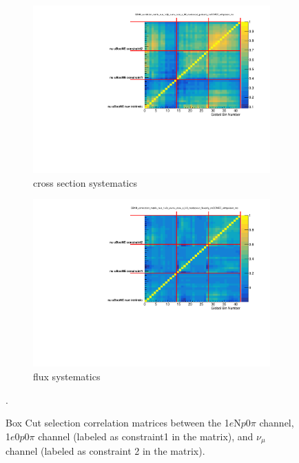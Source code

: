 \documentclass[a4paper]{article}
\newcommand{\npsel}{1$e$N$p$0$\pi$\xspace}
\newcommand{\zpsel}{1$e$0$p$0$\pi$\xspace}
\begin{document}
\begin{figure}[ht] 
\begin{center}
    \begin{subfigure}[b]{0.45\textwidth}
    \centering
    \includegraphics[width=1.00\textwidth]{Sensitivity/CorrelationMatrices/SBNfit_correlation_matrix_nue_1e0p_numu_reco_e_H0_newboxcut_genieonly_noCCMEC_withpoiserr_mc_withpoiserr_collapsed.pdf}
    \caption{cross section systematics}
    \end{subfigure}
    \begin{subfigure}[b]{0.45\textwidth}
    \centering
    \includegraphics[width=1.00\textwidth]{Sensitivity/CorrelationMatrices/SBNfit_correlation_matrix_nue_1e0p_numu_reco_e_H0_newboxcut_fluxonly_noCCMEC_withpoiserr_mc_withpoiserr_collapsed.pdf}
    \caption{flux systematics}
    \end{subfigure}
    \caption{\label{fig:boxcut_corr_matrix} Box Cut selection correlation matrices between the \npsel channel, \zpsel channel (labeled as constraint1 in the matrix), and $\nu_\mu$ channel (labeled as constraint 2 in the matrix). }.
\end{center}
\end{figure}
\end{document}
